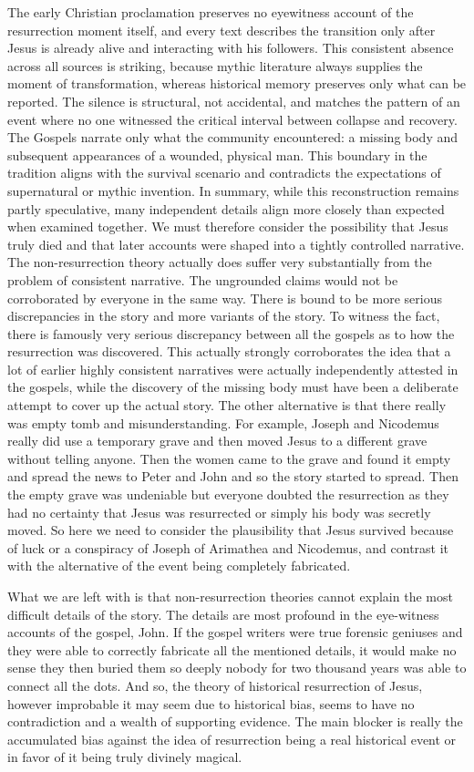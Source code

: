 The early Christian proclamation preserves no eyewitness account of the resurrection moment itself, and every text describes the transition only after Jesus is already alive and interacting with his followers.
This consistent absence across all sources is striking, because mythic literature always supplies the moment of transformation, whereas historical memory preserves only what can be reported.
The silence is structural, not accidental, and matches the pattern of an event where no one witnessed the critical interval between collapse and recovery.
The Gospels narrate only what the community encountered: a missing body and subsequent appearances of a wounded, physical man.
This boundary in the tradition aligns with the survival scenario and contradicts the expectations of supernatural or mythic invention.
In summary, while this reconstruction remains partly speculative, many independent details align more closely than expected when examined together.
We must therefore consider the possibility that Jesus truly died and that later accounts were shaped into a tightly controlled narrative.
The non-resurrection theory actually does suffer very substantially from the problem of consistent narrative.
The ungrounded claims would not be corroborated by everyone in the same way.
There is bound to be more serious discrepancies in the story and more variants of the story.
To witness the fact, there is famously very serious discrepancy between all the gospels as to how the resurrection was discovered.
This actually strongly corroborates the idea that a lot of earlier highly consistent narratives were actually independently attested in the gospels, while the discovery of the missing body must have been a deliberate attempt to cover up the actual story.
The other alternative is that there really was empty tomb and misunderstanding.
For example, Joseph and Nicodemus really did use a temporary grave and then moved Jesus to a different grave without telling anyone.
Then the women came to the grave and found it empty and spread the news to Peter and John and so the story started to spread.
Then the empty grave was undeniable but everyone doubted the resurrection as they had no certainty that Jesus was resurrected or simply his body was secretly moved.
So here we need to consider the plausibility that Jesus survived because of luck or a conspiracy of Joseph of Arimathea and Nicodemus, and contrast it with the alternative of the event being completely fabricated.

What we are left with is that non-resurrection theories cannot explain the most difficult details of the story.
The details are most profound in the eye-witness accounts of the gospel, John.
If the gospel writers were true forensic geniuses and they were able to correctly fabricate all the mentioned details, it would make no sense they then buried them so deeply nobody for two thousand years was able to connect all the dots.
And so, the theory of historical resurrection of Jesus, however improbable it may seem due to historical bias, seems to have no contradiction and a wealth of supporting evidence.
The main blocker is really the accumulated bias against the idea of resurrection being a real historical event or in favor of it being truly divinely magical.

